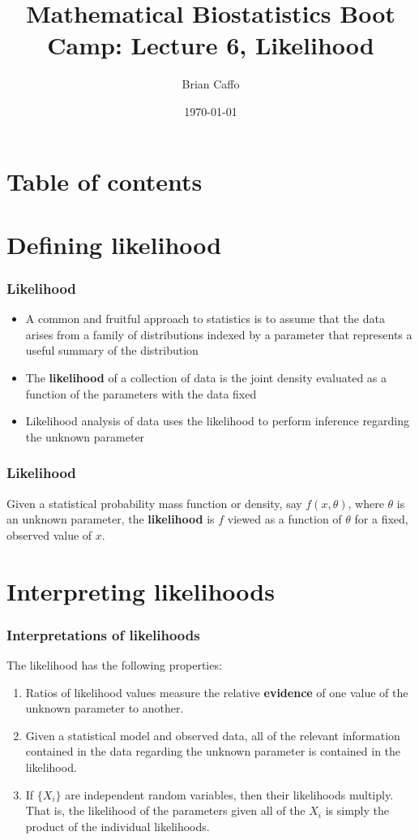 \documentclass[aspectratio=169]{beamer}
\title{Mathematical Biostatistics Boot Camp: Lecture 6, Likelihood}
\author{Brian Caffo}
\date{\today}
\institute[Department of Biostatistics]{
  Department of Biostatistics \\
  Johns Hopkins Bloomberg School of Public Health\\
  Johns Hopkins University
}
\begin{document}
\frame{\titlepage}


\section{Table of contents}


\section{Defining likelihood}
\begin{frame}\frametitle{Likelihood}
\begin{itemize}
\item A common and fruitful approach to statistics is to assume that
  the data arises from a family of distributions indexed by a
  parameter that represents a useful summary of the distribution
\item The {\bf likelihood} of a collection of data is the joint
  density evaluated as a function of the parameters with the data fixed
\item Likelihood analysis of data uses the likelihood to perform inference
  regarding the unknown parameter
\end{itemize}
\end{frame}

\begin{frame}\frametitle{Likelihood}
  Given a statistical probability mass function or density, say $f(x,
  \theta)$, where $\theta$ is an unknown parameter, the {\bf likelihood}
  is $f$ viewed as a function of $\theta$ for a fixed, observed value of
  $x$. 
\end{frame}

\section{Interpreting likelihoods}
\begin{frame}\frametitle{Interpretations of likelihoods}
The likelihood has the following properties:
  \begin{enumerate}
  \item Ratios of likelihood values measure the relative {\bf
      evidence} of one value of the unknown parameter to another.
  \item Given a statistical model and observed data, all of the relevant
    information contained in the data regarding the unknown parameter is
    contained in the likelihood.
  \item If $\{X_i\}$ are independent random variables, then their likelihoods
    multiply.  That is, the likelihood of the parameters given all of
    the $X_i$ is simply the product of the individual likelihoods.
  \end{enumerate}
\end{frame}
\end{document}
